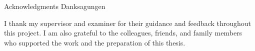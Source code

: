 \makeatletter
{}
{}
{}
\makeatother
\thispagestyle{empty}

\vspace*{20mm}

\begin{center}
\makeatletter
{}
{ Acknowledgments}
{ Danksagungen}
\makeatother
\end{center}

\vspace{10mm}

I thank my supervisor and examiner for their guidance and feedback throughout
this project. I am also grateful to the colleagues, friends, and family members
who supported the work and the preparation of this thesis.

\cleardoublepage{}
